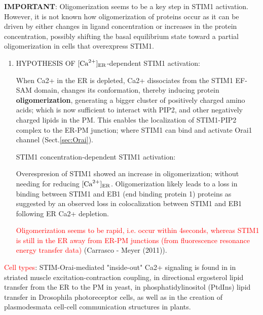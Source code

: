 {\bf IMPORTANT}: Oligomerization seems to be a key step in STIM1 activation.
However, it is not known how oligomerization of proteins occur as it can be
driven by either changes in ligand concentration or increases in the protein
concentration, possibly shifting the basal equilibrium state toward a partial
oligomerization in cells that overexpress STIM1.
\begin{enumerate}
  \item HYPOTHESIS OF $[{\text{Ca}^{2+}}]_{\text{ER}}$-dependent STIM1 activation:

When Ca2+ in the ER is depleted, Ca2+ dissociates from the STIM1 EF-SAM domain,
changes its conformation, thereby inducing protein {\bf oligomerization},
generating a bigger cluster of positively charged amino acids; which is now
sufficient to interact with PIP2, and other negatively charged lipids in the PM.
This enables the localization of STIM1-PIP2 complex to the ER-PM junction; where
STIM1 can bind and activate Orai1 channel (Sect.\ref{sec:Orai}).

  \item [STIM1]concentration-dependent STIM1 activation:

Overespresion of STIM1 showed an increase in oligomerization; without needing
for reducing $[{\text{Ca}^{2+}}]_{\text{ER}}$. Oligomerization likely leads to a loss in binding
between STIM1 and EB1 (end binding protein 1) proteins as suggested by an
observed loss in colocalization between STIM1 and EB1 following ER Ca2+
depletion.

\textcolor{red}{Oligomerization seems to be rapid, i.e. occur within 4seconds,
whereas STIM1 is still in the ER away from ER-PM junctions (from fluorescence
resonance energy transfer data)} (Carrasco - Meyer (2011)).
  
\end{enumerate}

 
\textcolor{red}{Cell types}: STIM-Orai-mediated "inside-out" Ca2+ signaling is
found in in striated muscle excitation-contraction coupling, in directional
ergosterol lipid transfer from the ER to the PM in yeast, in
phosphatidylinositol (PtdIns) lipid transfer in Drosophila photoreceptor cells,
as well as in the creation of plasmodesmata cell-cell communication structures
in plants.

